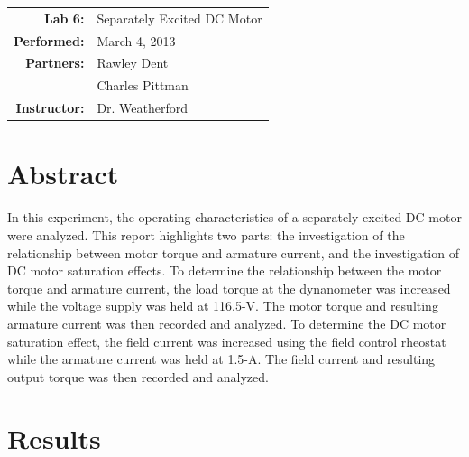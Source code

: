 \documentclass{article}
\begin{document}
\begin{tabular}{rl}
  \textbf{Lab 6:} & Separately Excited DC Motor \\
  \textbf{Performed:} & March 4, 2013 \\
  \textbf{Partners:} & Rawley Dent \\ & Charles Pittman \\
  \textbf{Instructor:} & Dr. Weatherford
\end{tabular}


\section*{Abstract}

In this experiment, the operating characteristics of a separately excited DC
motor were analyzed.  This report highlights two parts: the investigation of
the relationship between motor torque and armature current, and the
investigation of DC motor saturation effects.  To determine the relationship
between the motor torque and armature current, the load torque at the
dynanometer was increased while the voltage supply was held at 116.5-V.  The
motor torque and resulting armature current was then recorded and analyzed.  To
determine the DC motor saturation effect, the field current was increased using
the field control rheostat while the armature current was held at 1.5-A.  The
field current and resulting output torque was then recorded and analyzed.

\section*{Results}
\end{document}
